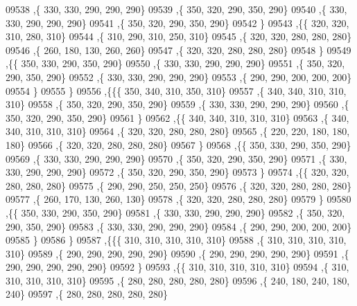 \begin{DoxyCode}
09538     ,\{   330,   330,   290,   290,   290\}
09539     ,\{   350,   320,   290,   350,   290\}
09540     ,\{   330,   330,   290,   290,   290\}
09541     ,\{   350,   320,   290,   350,   290\}
09542     \}
09543    ,\{\{   320,   320,   310,   280,   310\}
09544     ,\{   310,   290,   310,   250,   310\}
09545     ,\{   320,   320,   280,   280,   280\}
09546     ,\{   260,   180,   130,   260,   260\}
09547     ,\{   320,   320,   280,   280,   280\}
09548     \}
09549    ,\{\{   350,   330,   290,   350,   290\}
09550     ,\{   330,   330,   290,   290,   290\}
09551     ,\{   350,   320,   290,   350,   290\}
09552     ,\{   330,   330,   290,   290,   290\}
09553     ,\{   290,   290,   200,   200,   200\}
09554     \}
09555    \}
09556   ,\{\{\{   350,   340,   310,   350,   310\}
09557     ,\{   340,   340,   310,   310,   310\}
09558     ,\{   350,   320,   290,   350,   290\}
09559     ,\{   330,   330,   290,   290,   290\}
09560     ,\{   350,   320,   290,   350,   290\}
09561     \}
09562    ,\{\{   340,   340,   310,   310,   310\}
09563     ,\{   340,   340,   310,   310,   310\}
09564     ,\{   320,   320,   280,   280,   280\}
09565     ,\{   220,   220,   180,   180,   180\}
09566     ,\{   320,   320,   280,   280,   280\}
09567     \}
09568    ,\{\{   350,   330,   290,   350,   290\}
09569     ,\{   330,   330,   290,   290,   290\}
09570     ,\{   350,   320,   290,   350,   290\}
09571     ,\{   330,   330,   290,   290,   290\}
09572     ,\{   350,   320,   290,   350,   290\}
09573     \}
09574    ,\{\{   320,   320,   280,   280,   280\}
09575     ,\{   290,   290,   250,   250,   250\}
09576     ,\{   320,   320,   280,   280,   280\}
09577     ,\{   260,   170,   130,   260,   130\}
09578     ,\{   320,   320,   280,   280,   280\}
09579     \}
09580    ,\{\{   350,   330,   290,   350,   290\}
09581     ,\{   330,   330,   290,   290,   290\}
09582     ,\{   350,   320,   290,   350,   290\}
09583     ,\{   330,   330,   290,   290,   290\}
09584     ,\{   290,   290,   200,   200,   200\}
09585     \}
09586    \}
09587   ,\{\{\{   310,   310,   310,   310,   310\}
09588     ,\{   310,   310,   310,   310,   310\}
09589     ,\{   290,   290,   290,   290,   290\}
09590     ,\{   290,   290,   290,   290,   290\}
09591     ,\{   290,   290,   290,   290,   290\}
09592     \}
09593    ,\{\{   310,   310,   310,   310,   310\}
09594     ,\{   310,   310,   310,   310,   310\}
09595     ,\{   280,   280,   280,   280,   280\}
09596     ,\{   240,   180,   240,   180,   240\}
09597     ,\{   280,   280,   280,   280,   280\}

\end{DoxyCode}
